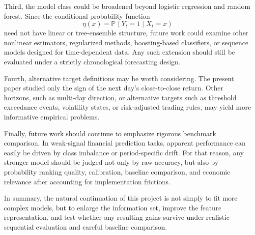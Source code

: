 \documentclass[11pt,a4paper]{article}
\begin{document}
	Third, the model class could be broadened beyond logistic regression and random forest. Since the conditional probability function
	\[
	\eta(x) = \mathbb{P}(Y_t = 1 \mid X_t = x)
	\]
	need not have linear or tree-ensemble structure, future work could examine other nonlinear estimators, regularized methods, boosting-based classifiers, or sequence models designed for time-dependent data. Any such extension should still be evaluated under a strictly chronological forecasting design.
	
	Fourth, alternative target definitions may be worth considering. The present paper studied only the sign of the next day's close-to-close return. Other horizons, such as multi-day direction, or alternative targets such as threshold exceedance events, volatility states, or risk-adjusted trading rules, may yield more informative empirical problems.
	
	Finally, future work should continue to emphasize rigorous benchmark comparison. In weak-signal financial prediction tasks, apparent performance can easily be driven by class imbalance or period-specific drift. For that reason, any stronger model should be judged not only by raw accuracy, but also by probability ranking quality, calibration, baseline comparison, and economic relevance after accounting for implementation frictions.
	
	In summary, the natural continuation of this project is not simply to fit more complex models, but to enlarge the information set, improve the feature representation, and test whether any resulting gains survive under realistic sequential evaluation and careful baseline comparison.
	
\end{document}

